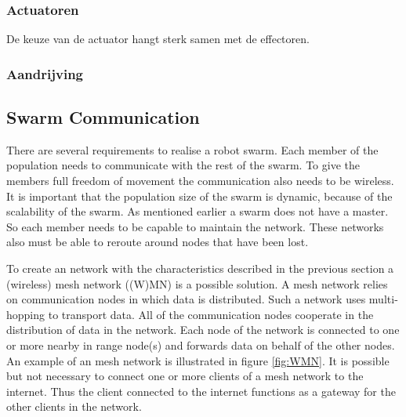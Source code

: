 \documentclass[10pt,a4paper]{article}
\begin{document}
\subsubsection{Actuatoren}

De keuze van de actuator hangt sterk samen met de effectoren.

\subsubsection{Aandrijving}

\newpage
\subsection{Swarm Communication}
There are several requirements to realise a robot swarm. Each member of the population needs to communicate with the rest of the swarm. To give the members full freedom of movement the communication also needs to be wireless. It is important that the population size of the swarm is dynamic, because of the scalability of the swarm. As mentioned earlier a swarm does not have a master. So each member needs to be capable to maintain the network. These networks also must be able to reroute around nodes that have been lost.

To create an network with the characteristics described in the previous section a (wireless) mesh network ((W)MN) is a possible solution. A mesh network relies on communication nodes in which data is distributed. Such a network uses multi-hopping to transport data.\cite{multi-hopwirelessnetworks} All of the communication nodes cooperate in the distribution of data in the network. Each node of the network is connected to one or more nearby in range node(s) and forwards data on behalf of the other nodes. \cite{meshnetworking} An example of an mesh network is illustrated in figure \ref{fig:WMN}. It is possible but not necessary to connect one or more clients of a mesh network to the internet. Thus the client connected to the internet functions as a gateway for the other clients in the network. \cite{wirelessmeshnetworksopportunitiesandchallenges}
\end{document}
